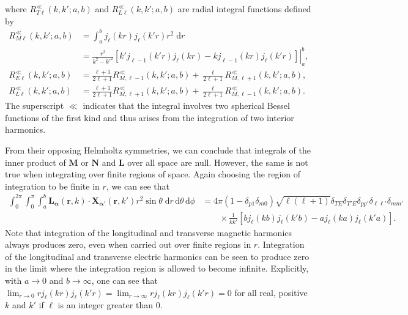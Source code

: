 \documentclass{article}
\begin{document}
where $R_{T\ell}^\ll(k,k';a,b)$ and $R_{L\ell}^\ll(k,k';a,b)$ are radial integral functions defined by
\begin{equation}\label{eq:finiteRadialIntegrals}
\begin{split}
R_{M\ell}^\ll(k,k';a,b) &= \int_a^bj_\ell(kr)j_\ell(k'r)r^2\;\mathrm{d}r\\
&= \left.\frac{r^2}{k^2 - k'^2}\left[k'j_{\ell - 1}(k'r)j_\ell(kr) - kj_{\ell - 1}(kr)j_\ell(k'r)\right]\right|_a^b,\\[0.5em]
R_{E\ell}^\ll(k,k';a,b) &= \frac{\ell + 1}{2\ell + 1}R_{M,\ell - 1}^\ll(k,k';a,b) + \frac{\ell}{2\ell + 1}R_{M,\ell + 1}^\ll(k,k';a,b),\\
R_{L\ell}^\ll(k,k';a,b) &= \frac{\ell + 1}{2\ell + 1}R_{M,\ell + 1}^\ll(k,k';a,b) + \frac{\ell}{2\ell + 1}R_{M,\ell - 1}^\ll(k,k';a,b).
\end{split}
\end{equation}
The superscript $\ll$ indicates that the integral involves two spherical Bessel functions of the first kind and thus arises from the integration of two interior harmonics. 

From their opposing Helmholtz symmetries, we can conclude that integrals of the inner product of $\mathbf{M}$ or $\mathbf{N}$ and $\mathbf{L}$ over all space are null. However, the same is not true when integrating over finite regions of space. Again choosing the region of integration to be finite in $r$, we can see that
\begin{equation}\label{eq:vectorSphericalHarmonicOrthogonalityConditionFiniteMixed}
\begin{split}
\int_0^{2\pi}\int_0^{\pi}\int_a^b\mathbf{L}_{\bm{\alpha}}(\mathbf{r},k)\cdot\mathbf{X}_{\bm{\alpha}'}(\mathbf{r},k')r^2\sin\theta\;\mathrm{d}r\,\mathrm{d}\theta\,\mathrm{d}\phi &= 4\pi(1 - \delta_{p1}\delta_{m0})\sqrt{\ell(\ell + 1)}\delta_{TE}\delta_{T'E}\delta_{pp'}\delta_{\ell\ell'}\delta_{mm'}\\[-0.5em]
&\qquad\times\frac{1}{kk'}\left[bj_\ell(kb)j_\ell(k'b) - aj_\ell(ka)j_\ell(k'a)\right].
\end{split}
\end{equation}
Note that integration of the longitudinal and transverse magnetic harmonics always produces zero, even when carried out over finite regions in $r$. Integration of the longitudinal and transverse electric harmonics can be seen to produce zero in the limit where the integration region is allowed to become infinite. Explicitly, with $a\to0$ and $b\to\infty$, one can see that $\lim_{r\to0}rj_\ell(kr)j_\ell(k'r) = \lim_{r\to\infty}rj_\ell(kr)j_\ell(k'r) = 0$ for all real, positive $k$ and $k'$ if $\ell$ is an integer greater than 0.
\end{document}
